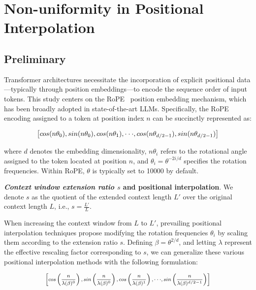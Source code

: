 \section{Non-uniformity in Positional Interpolation}
\label{sec:analysis}

\subsection{Preliminary}

Transformer architectures necessitate the incorporation of explicit positional data—typically through position embeddings—to encode the sequence order of input tokens. This study centers on the RoPE~\cite{rope} position embedding mechanism, which has been broadly adopted in state-of-the-art LLMs. Specifically, the RoPE encoding assigned to a token at position index $n$ can be succinctly represented as:

\begin{equation}
		\fontsize{7.8}{7.8} \selectfont
	\label{eq:rope}
	\left[ cos(n\theta_0), sin(n\theta_0), cos(n\theta_1), \cdot\cdot\cdot, cos(n\theta_{d/2-1}), sin(n\theta_{d/2-1}) \right]   
\end{equation}

where $d$ denotes the embedding dimensionality, 
$n\theta_i$ refers to the rotational angle assigned to the token located at position $n$, and 
$\theta_i=\theta^{-2i/d}$ specifies the rotation frequencies. Within RoPE, $\theta$ is typically set to 10000 by default.

\textbf{\emph{Context window extension ratio $s$} and positional interpolation}. We denote $s$ as the quotient of the extended context length $L'$ over the original context length $L$, i.e., $s=\frac{L'}{L}$.

When increasing the context window from $L$ to $L'$, prevailing positional interpolation techniques propose modifying the rotation frequencies $\theta_i$ by scaling them according to the extension ratio $s$. Defining $\beta=\theta^{2/d}$, and letting $\lambda$ represent the effective rescaling factor corresponding to $s$, we can generalize these various positional interpolation methods with the following formulation:

\begin{equation}	
	\fontsize{7.5}{7.5} \selectfont
	\label{eq:unified_rope}
	\begin{aligned}
		\left[cos\left(\frac{n}{\lambda(\beta)^0}\right), sin \left(\frac{n}{\lambda(\beta)^0}\right), cos\left(\frac{n}{\lambda(\beta)^1}\right), \cdot\cdot\cdot,  sin \left(\frac{n}{\lambda(\beta)^{d/2-1}}\right) \right]   
	\end{aligned}
\end{equation}

